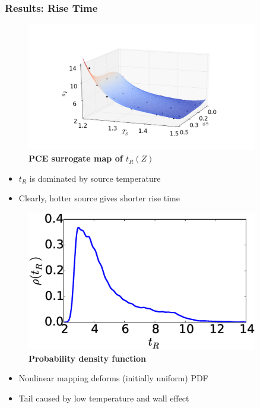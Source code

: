 \documentclass[9pt]{beamer}
\begin{document}
\begin{frame}
\frametitle{Results: Rise Time}
\label{sec-5-4}


\centering
\begin{minipage}[b]{0.45\linewidth}
\begin{figure}[ht]
\includegraphics[width=0.9\textwidth,trim = 40mm 0mm 40mm 0mm,clip]{PCEMapTR_matplotlib} \\
\textbf{PCE surrogate map of $t_R(Z)$} \\
\end{figure}
\begin{itemize}
\item $t_R$ is dominated by source temperature
\item Clearly, hotter source gives shorter rise time
\end{itemize}
\end{minipage}
\begin{minipage}[b]{0.45\linewidth}
\begin{figure}[ht]
\includegraphics[width=0.9\textwidth]{PCEStatTR_matplotlib} \\
\textbf{Probability density function} \\
\end{figure}
\begin{itemize}
\item Nonlinear mapping deforms (initially uniform) PDF
\item Tail caused by low temperature and wall effect
\end{itemize}
\end{minipage}
\end{frame}
\end{document}
